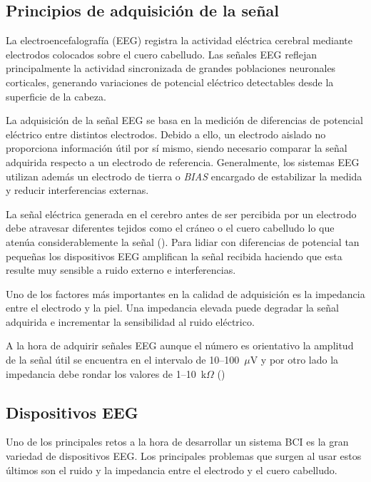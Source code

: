 \subsection{Principios de adquisición de la señal}
\label{subsec:PrincipiosAdquisicionEEG}

La electroencefalografía (EEG) registra la actividad eléctrica cerebral mediante electrodos colocados sobre el cuero cabelludo. Las señales EEG reflejan principalmente la actividad sincronizada de grandes poblaciones neuronales corticales, generando variaciones de potencial eléctrico detectables desde la superficie de la cabeza.

La adquisición de la señal EEG se basa en la medición de diferencias de potencial eléctrico entre distintos electrodos. Debido a ello, un electrodo aislado no proporciona información útil por sí mismo, siendo necesario comparar la señal adquirida respecto a un electrodo de referencia. Generalmente, los sistemas EEG utilizan además un electrodo de tierra o \textit{BIAS} encargado de estabilizar la medida y reducir interferencias externas.

La señal eléctrica generada en el cerebro antes de ser percibida por un electrodo debe atravesar diferentes tejidos como el cráneo o el cuero cabelludo lo que atenúa considerablemente la señal (\cite{nunez2006electric}). Para lidiar con diferencias de potencial tan pequeñas los dispositivos EEG amplifican la señal recibida haciendo que esta resulte muy sensible a ruido externo e interferencias.  

Uno de los factores más importantes en la calidad de adquisición es la impedancia entre el electrodo y la piel. Una impedancia elevada puede degradar la señal adquirida e incrementar la sensibilidad al ruido eléctrico. 

A la hora de adquirir señales EEG aunque el número es orientativo la amplitud de la señal útil se encuentra en el intervalo de 10--100~$\mu$V y por otro lado la impedancia debe rondar los valores de 1--10~k$\Omega$ (\cite{usakli2010improvement})

\subsection{Dispositivos EEG}
\label{subsec:DispositivosEEG}
Uno de los principales retos a la hora de desarrollar un sistema BCI es la gran variedad de dispositivos EEG. Los principales problemas que surgen al usar estos últimos son el ruido y la impedancia entre el electrodo y el cuero cabelludo. 

